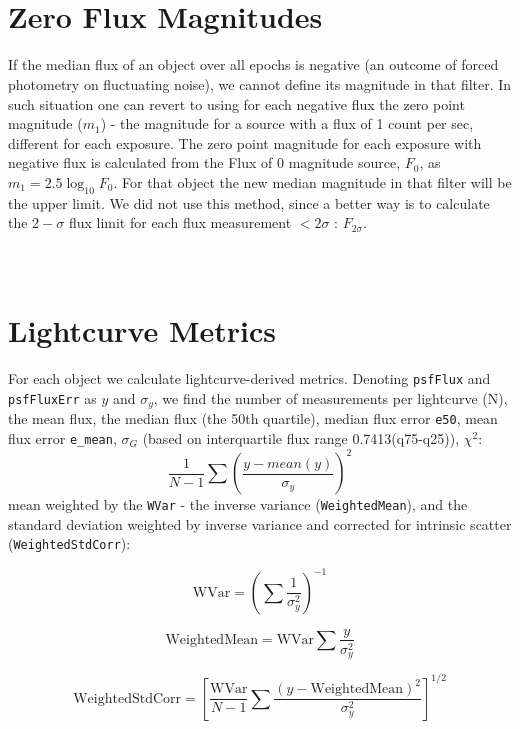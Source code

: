 \documentclass[fleqn,usenatbib]{mnras}  %
\begin{document}
\section{\\ Zero Flux Magnitudes }
\label{App:AppendixD}

If the median flux of an object over all epochs  is negative (an outcome of forced photometry on fluctuating noise), we cannot define its magnitude in that filter.  In such situation one can revert to  using for each negative flux the zero point magnitude ($m_1$) - the magnitude for a source with a flux of 1 count per sec, different for each exposure.  The zero point magnitude for each exposure with negative flux is calculated from the  Flux of 0 magnitude source,  $F_0$,  as  $m_{1} = 2.5 \log_{10}{F_{0}}$. For that object the new median magnitude in that filter will be the upper limit. We did not use this method, since a better way is to calculate the $2-\sigma$ flux limit for each flux measurement $< 2 \sigma$ : $F_{2\sigma}$. 

\section{\\ Lightcurve Metrics}
For each object we calculate lightcurve-derived metrics. Denoting \verb|psfFlux| and \verb|psfFluxErr| as $y$ and $\sigma_{y}$, we find the number of measurements per lightcurve (N), the mean flux, the median flux (the 50th quartile), median flux error \verb|e50|, mean flux error \verb|e_mean|, $\sigma_{G}$ (based on interquartile flux range 0.7413(q75-q25)), $\chi^{2}$:
\begin{equation}
\frac{1}{N-1} \sum{\left( \frac{y-mean(y)}{\sigma_{y}} \right) ^{2}}
\end{equation}
 mean weighted by the \verb|WVar| - the inverse variance (\verb|WeightedMean|), and the standard deviation weighted by inverse variance and corrected for intrinsic scatter (\verb|WeightedStdCorr|):

\begin{equation}
\mbox{WVar} = \left( \sum{\frac{1}{\sigma_{y}^{2}}} \right) ^{-1}
\end{equation} 

\begin{equation}
\mbox{WeightedMean} = \mbox{WVar} \sum{\frac{y}{\sigma_{y}^{2}}}
\end{equation}

\begin{equation}
\mbox{WeightedStdCorr} =  \left[ \frac{ \mbox{WVar}  }{N-1} \sum{\frac{(y-\mbox{WeightedMean})^{2}}{\sigma_{y}^{2}}} \right] ^{1/2}
\end{equation}
\end{document}
